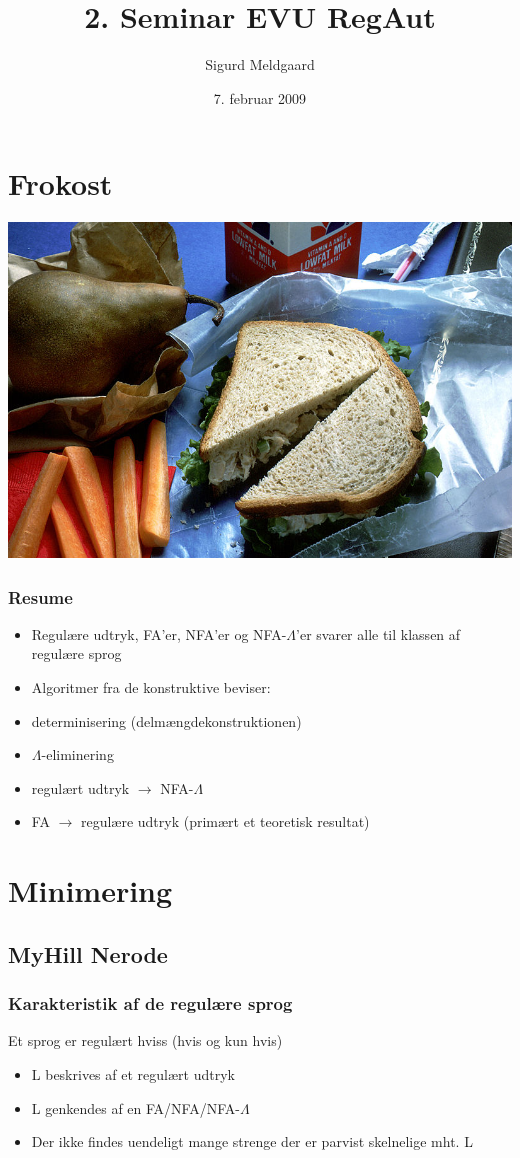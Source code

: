 \documentclass[]{beamer}
\title{2. Seminar EVU RegAut}
\author{Sigurd Meldgaard}
\date{7. februar 2009}
\begin{document}
\maketitle



\section{Frokost}
\begin{frame}
  \begin{center}
    \includegraphics{images/lunch}
  \end{center}
\end{frame}
\begin{frame}
\frametitle{Resume}
\begin{itemize}
\item Regulære udtryk, FA’er, NFA’er og NFA-$\Lambda$’er
svarer alle til klassen af regulære sprog
\item Algoritmer fra de konstruktive beviser:
\item determinisering (delmængdekonstruktionen)
\item $\Lambda$-eliminering
\item regulært udtryk $\rightarrow$  NFA-$\Lambda$
\item FA $\rightarrow$ regulære udtryk (primært et teoretisk resultat)
\end{itemize}
\end{frame}
\section{Minimering}
\subsection{MyHill Nerode}
\begin{frame}
\frametitle{Karakteristik af de regulære sprog}
Et sprog er regulært hviss (hvis og kun hvis)
\begin{itemize}[<+->]
\item L beskrives af et regulært udtryk
\item L genkendes af en FA/NFA/NFA-$\Lambda$
\item \alert{Der ikke findes uendeligt mange strenge der er parvist
  skelnelige mht. L}
\end{itemize}
\end{frame}
\end{document}
